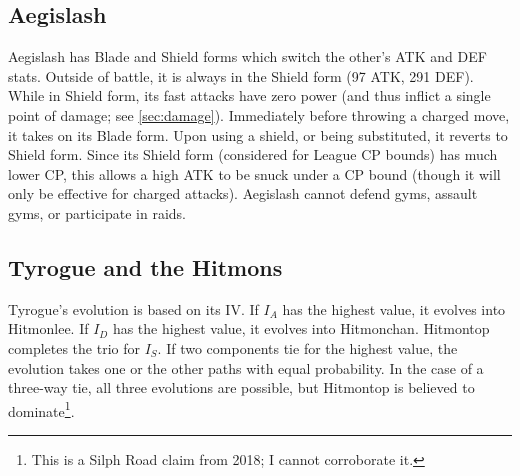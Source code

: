 \subsection{Aegislash\label{subsec:aegislash}}
Aegislash has Blade and Shield forms which switch the other's ATK and DEF stats.
Outside of battle, it is always in the Shield form (97 ATK, 291 DEF).
While in Shield form, its fast attacks have zero power (and thus inflict
  a single point of damage; see \autoref{sec:damage}).
Immediately before throwing a charged move, it takes on its Blade form.
Upon using a shield, or being substituted, it reverts to Shield form.
Since its Shield form (considered for League CP bounds) has much lower CP,
 this allows a high ATK to be snuck under a CP bound (though it will only
 be effective for charged attacks).
Aegislash cannot defend gyms, assault gyms, or participate in raids.

\subsection{Tyrogue and the Hitmons\label{subsec:tyrogue}}
Tyrogue's evolution is based on its IV.
If $I_A$ has the highest value, it evolves into Hitmonlee.
If $I_D$ has the highest value, it evolves into Hitmonchan.
Hitmontop completes the trio for $I_S$.
If two components tie for the highest value, the evolution takes one or the other
 paths with equal probability.
In the case of a three-way tie, all three evolutions are possible, but Hitmontop is believed to
 dominate\footnote{This is a Silph Road claim from 2018; I cannot corroborate it.}.
